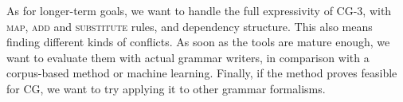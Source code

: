 As for longer-term goals, we want to handle the full expressivity of CG-3,
with \textsc{map}, \textsc{add} and \textsc{substitute} rules, and
dependency structure. This also means finding different kinds of conflicts.
As soon as the tools are mature enough, we want to
evaluate them with actual grammar writers,
in comparison with a corpus-based method or machine learning.
Finally, if the method proves feasible for CG, we want
to try applying it to other grammar formalisms.



